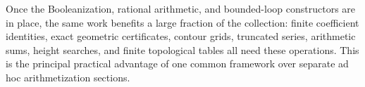 Once the Booleanization, rational arithmetic, and bounded-loop constructors
are in place, the same work benefits a large fraction of the collection:
finite coefficient identities, exact geometric certificates, contour
grids, truncated series, arithmetic sums, height searches, and finite
topological tables all need these operations.  This is the principal
practical advantage of one common framework over separate ad hoc
arithmetization sections.
